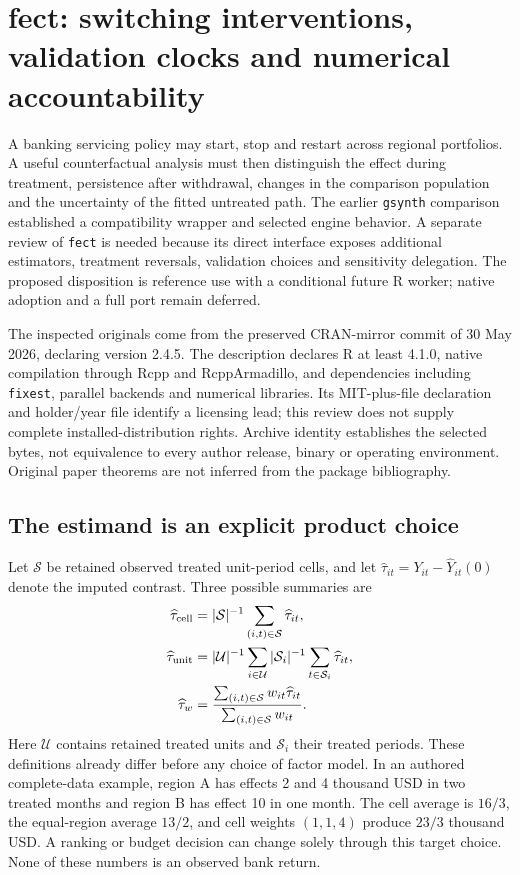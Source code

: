 \section{fect: switching interventions, validation clocks and numerical accountability}
\label{sec:exec24-fect-reuse}

A banking servicing policy may start, stop and restart across regional
portfolios. A useful counterfactual analysis must then distinguish the effect
during treatment, persistence after withdrawal, changes in the comparison
population and the uncertainty of the fitted untreated path. The earlier
\texttt{gsynth} comparison established a compatibility wrapper and selected
engine behavior. A separate review of \texttt{fect} is needed because its
direct interface exposes additional estimators, treatment reversals,
validation choices and sensitivity delegation. The proposed disposition is
reference use with a conditional future R worker; native adoption and a full
port remain deferred.~\citep{exec21_gsynth_wrapper,exec21_gsynth_engine,exec24_fect_choice}

The inspected originals come from the preserved CRAN-mirror commit of
30 May 2026, declaring version 2.4.5. The description declares R at least
4.1.0, native compilation through Rcpp and RcppArmadillo, and dependencies
including \texttt{fixest}, parallel backends and numerical libraries.
Its MIT-plus-file declaration and holder/year file identify a licensing
lead; this review does not supply complete installed-distribution rights.
Archive identity establishes the selected bytes, not equivalence to every
author release, binary or operating environment. Original paper theorems
are not inferred from the package bibliography.~\citep{exec24_fect_source,v12_sw_fect}

\subsection{The estimand is an explicit product choice}
Let $\mathcal S$ be retained observed treated unit-period cells, and let
$\widehat\tau_{it}=Y_{it}-\widehat Y_{it}(0)$ denote the imputed contrast.
Three possible summaries are
\begin{align}
 \widehat\tau_{\rm cell}&=|\mathcal S|^{-1}
      \sum_{(i,t)\in\mathcal S}\widehat\tau_{it},\\
 \widehat\tau_{\rm unit}&=|\mathcal U|^{-1}\sum_{i\in\mathcal U}
      |\mathcal S_i|^{-1}\sum_{t\in\mathcal S_i}\widehat\tau_{it},\\
 \widehat\tau_w&=\frac{\sum_{(i,t)\in\mathcal S}w_{it}\widehat\tau_{it}}
                       {\sum_{(i,t)\in\mathcal S}w_{it}}.
\end{align}
Here $\mathcal U$ contains retained treated units and $\mathcal S_i$ their
treated periods. These definitions already differ before any choice of
factor model. In an authored complete-data example, region A has effects
2 and 4 thousand USD in two treated months and region B has effect 10 in
one month. The cell average is $16/3$, the equal-region average $13/2$,
and cell weights $(1,1,4)$ produce $23/3$ thousand USD. A ranking or budget
decision can change solely through this target choice. None of these
numbers is an observed bank return.~\citep{exec24_fect_choice}

